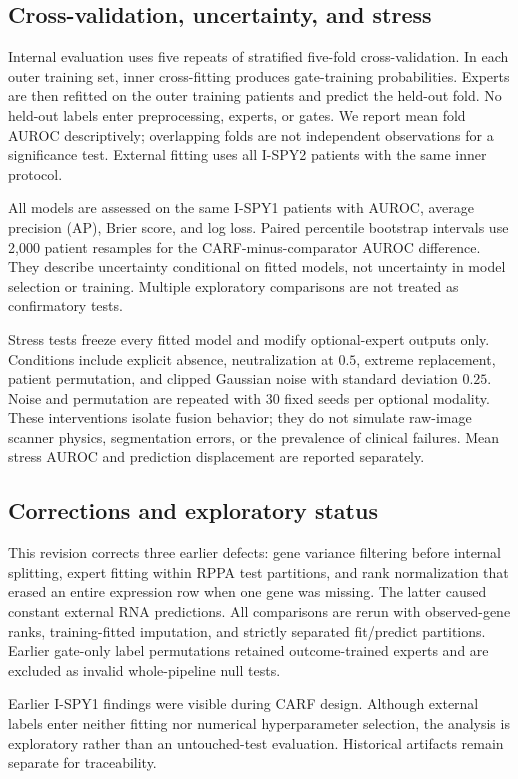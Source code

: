 \documentclass[runningheads]{llncs}
\begin{document}
\subsection{Cross-validation, uncertainty, and stress}
Internal evaluation uses five repeats of stratified five-fold cross-validation. In each outer training set, inner cross-fitting produces gate-training probabilities. Experts are then refitted on the outer training patients and predict the held-out fold. No held-out labels enter preprocessing, experts, or gates. We report mean fold AUROC descriptively; overlapping folds are not independent observations for a significance test. External fitting uses all I-SPY2 patients with the same inner protocol.

All models are assessed on the same I-SPY1 patients with AUROC, average precision (AP), Brier score, and log loss. Paired percentile bootstrap intervals use 2,000 patient resamples for the CARF-minus-comparator AUROC difference. They describe uncertainty conditional on fitted models, not uncertainty in model selection or training. Multiple exploratory comparisons are not treated as confirmatory tests.

Stress tests freeze every fitted model and modify optional-expert outputs only. Conditions include explicit absence, neutralization at $0.5$, extreme replacement, patient permutation, and clipped Gaussian noise with standard deviation $0.25$. Noise and permutation are repeated with 30 fixed seeds per optional modality. These interventions isolate fusion behavior; they do not simulate raw-image scanner physics, segmentation errors, or the prevalence of clinical failures. Mean stress AUROC and prediction displacement are reported separately.

\subsection{Corrections and exploratory status}
This revision corrects three earlier defects: gene variance filtering before internal splitting, expert fitting within RPPA test partitions, and rank normalization that erased an entire expression row when one gene was missing. The latter caused constant external RNA predictions. All comparisons are rerun with observed-gene ranks, training-fitted imputation, and strictly separated fit/predict partitions. Earlier gate-only label permutations retained outcome-trained experts and are excluded as invalid whole-pipeline null tests.

Earlier I-SPY1 findings were visible during CARF design. Although external labels enter neither fitting nor numerical hyperparameter selection, the analysis is exploratory rather than an untouched-test evaluation. Historical artifacts remain separate for traceability.
\end{document}
